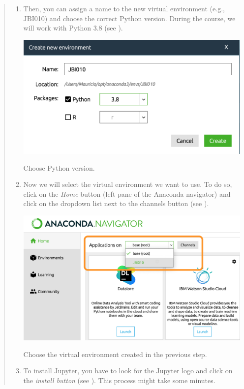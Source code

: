\documentclass{latex-template/tufte-handout}
\begin{document}
\begin{quote}
\begin{enumerate}
		\item Then, you can assign a name to the new virtual environment (e.g., JBI010) and choose the correct Python version. During the course, we will work with Python 3.8 (see ).
			\begin{marginfigure}[-20em]%
			  \includegraphics[width=\linewidth]{assets/03-python-version}
			  \caption{Choose Python version.}
			  \label{fig:img3}
			\end{marginfigure}
		\item Now we will select the virtual environment we want to use. To do so, click on the \emph{Home} button (left pane of the Anaconda navigator) and click on the dropdown list next to the channels button (see ).
			\begin{marginfigure}[-7em]%
			  \includegraphics[width=\linewidth]{assets/04-choose-ve}
			  \caption{Choose the virtual environment created in the previous step.}
			  \label{fig:img4}
			\end{marginfigure}
		\item To install Jupyter, you have to  look for the Jupyter logo and click on the \emph{install button} (see ). This process might take some minutes.

\end{enumerate}
\end{quote}
\end{document}
